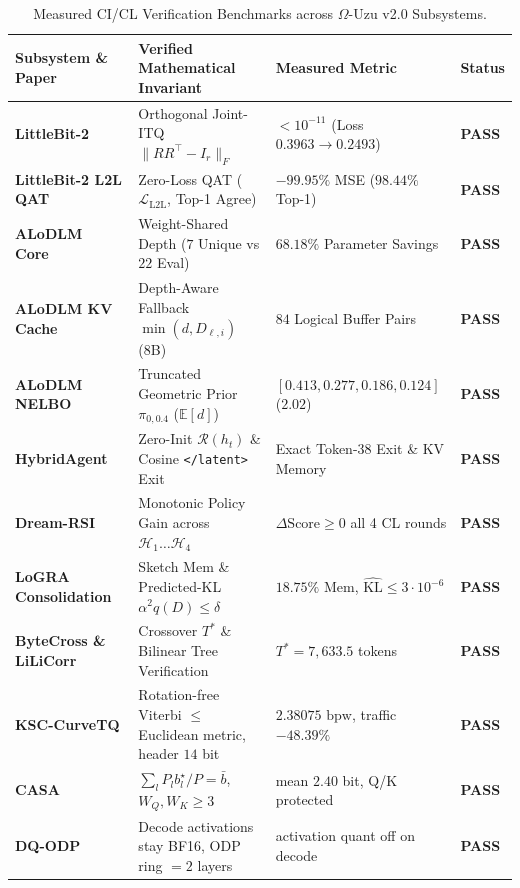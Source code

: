 \documentclass[10pt,a4paper]{article}
\begin{document}
\begin{table}[h!]
\centering
\footnotesize
\caption{Measured CI/CL Verification Benchmarks across $\Omega$-Uzu v2.0 Subsystems.}
\label{tab:cicl_verification}
\begin{tabular}{@{}llll@{}}
\toprule
\textbf{Subsystem \& Paper} & \textbf{Verified Mathematical Invariant} & \textbf{Measured Metric} & \textbf{Status} \\
\midrule
\textbf{LittleBit-2}~\cite{littlebit22026} & Orthogonal Joint-ITQ $\|R R^\top - I_r\|_F$ & $< 10^{-11}$ (Loss $0.3963 \to 0.2493$) & \textbf{PASS} \\
\textbf{LittleBit-2 L2L QAT}~\cite{littlebit22026} & Zero-Loss QAT ($\mathcal{L}_{\mathrm{L2L}}$, Top-1 Agree) & $-99.95\%$ MSE ($98.44\%$ Top-1) & \textbf{PASS} \\
\textbf{ALoDLM Core}~\cite{alodlm2026} & Weight-Shared Depth ($7$ Unique vs $22$ Eval) & $68.18\%$ Parameter Savings & \textbf{PASS} \\
\textbf{ALoDLM KV Cache}~\cite{alodlm2026} & Depth-Aware Fallback $\min(d, D_{\ell,i})$ (8B) & $84$ Logical Buffer Pairs & \textbf{PASS} \\
\textbf{ALoDLM NELBO}~\cite{alodlm2026} & Truncated Geometric Prior $\pi_{0,0.4}$ ($\mathbb{E}[d]$) & $[0.413, 0.277, 0.186, 0.124]$ ($2.02$) & \textbf{PASS} \\
\textbf{HybridAgent}~\cite{hybridagent2026} & Zero-Init $\mathcal{R}(h_t)$ \& Cosine \texttt{</latent>} Exit & Exact Token-38 Exit \& KV Memory & \textbf{PASS} \\
\textbf{Dream-RSI}~\cite{dreamrsi2026} & Monotonic Policy Gain across $\mathcal{H}_1 \dots \mathcal{H}_4$ & $\Delta\text{Score} \ge 0$ all 4 CL rounds & \textbf{PASS} \\
\textbf{LoGRA Consolidation}~\cite{logra2026} & Sketch Mem \& Predicted-KL $\alpha^2 q(D) \le \delta$ & $18.75\%$ Mem, $\widehat{\mathrm{KL}} \le 3\cdot 10^{-6}$ & \textbf{PASS} \\
\textbf{ByteCross \& LiLiCorr}~\cite{lee2026bytecross,rusanovsky2026lilicorr} & Crossover $T^*$ \& Bilinear Tree Verification & $T^* = 7{,}633.5$ tokens & \textbf{PASS} \\
\textbf{KSC-CurveTQ} & Rotation-free Viterbi $\le$ Euclidean metric, header $14$ bit & $2.38075\text{ bpw}$, traffic $-48.39\%$ & \textbf{PASS} \\
\textbf{CASA} & $\sum_l P_l b_l^\star / P = \bar{b}$, $W_Q,W_K \ge 3$ & mean $2.40$ bit, Q/K protected & \textbf{PASS} \\
\textbf{DQ-ODP} & Decode activations stay BF16, ODP ring $= 2$ layers & activation quant off on decode & \textbf{PASS} \\

\end{tabular}
\end{table}
\end{document}

